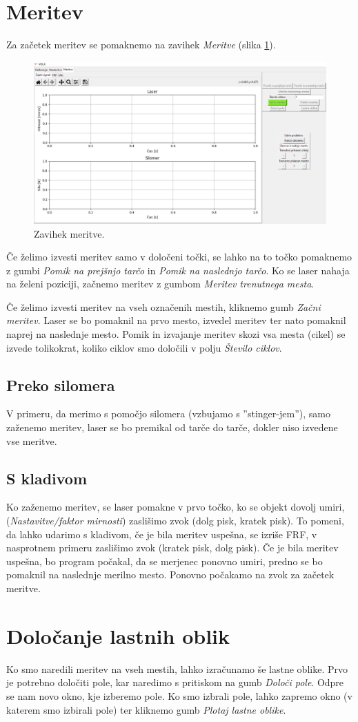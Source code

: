 \newpage
\section{Meritev}
Za začetek meritev se pomaknemo na zavihek \textit{Meritve} (slika \ref{fig:tab3}).
\begin{figure}[H]
    \centering
    \includegraphics[width=0.9\linewidth]{slike/meritve.png}
    \caption{Zavihek meritve.}
    \label{fig:tab3}
\end{figure}
Če želimo izvesti meritev samo v določeni točki, se lahko na to točko pomaknemo z gumbi \textit{Pomik na prejšnjo tarčo} in \textit{Pomik na naslednjo tarčo}. Ko se laser nahaja na želeni poziciji, začnemo meritev z gumbom \textit{Meritev trenutnega mesta}.

Če želimo izvesti meritev na vseh označenih mestih, kliknemo gumb \textit{Začni meritev}. Laser se bo pomaknil na prvo mesto, izvedel meritev ter nato pomaknil naprej na naslednje mesto. Pomik in izvajanje meritev skozi vsa mesta (cikel) se izvede tolikokrat, koliko ciklov smo določili v polju \textit{Število ciklov}.

\subsection{Preko silomera}
V primeru, da merimo s pomočjo silomera (vzbujamo s ''stinger-jem''), samo zaženemo meritev, laser se bo premikal od tarče do tarče, dokler niso izvedene vse meritve.
\subsection{S kladivom}
Ko zaženemo meritev, se laser pomakne v prvo točko, ko se objekt dovolj umiri, (\textit{Nastavitve/faktor mirnosti}) zaslišimo zvok (dolg pisk, kratek pisk). To pomeni, da lahko udarimo s kladivom, če je bila meritev uspešna, se izriše FRF, v nasprotnem primeru zaslišimo zvok (kratek pisk, dolg pisk). Če je bila meritev uspešna, bo program počakal, da se merjenec ponovno umiri, predno se bo pomaknil na naslednje merilno mesto. Ponovno počakamo na zvok za začetek meritve.
\section{Določanje lastnih oblik}
Ko smo naredili meritev na vseh mestih, lahko izračunamo še lastne oblike. Prvo je potrebno določiti pole, kar naredimo s pritiskom na gumb \textit{Določi pole}. Odpre se nam novo okno, kje izberemo pole. Ko smo izbrali pole, lahko zapremo okno (v katerem smo izbirali pole) ter kliknemo gumb \textit{Plotaj lastne oblike}.
